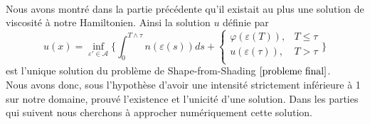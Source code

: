 ~\\

Nous avons montré dans la partie précédente qu'il existait au plus une solution de viscosité à notre Hamiltonien. Ainsi la solution $u$ définie par 
\begin{equation*}
    u(x)= \inf_{\varepsilon'\in \mathcal{A}}\biggl\{\int_{0}^{T\wedge \tau}n(\varepsilon(s))ds +
    \begin{cases}
        \varphi\left(\varepsilon\left(T\right)\right), &T\le \tau\\
        u\left(\varepsilon\left(\tau\right)\right), &T> \tau\\ 
    \end{cases}\biggl\}
\end{equation*}
est l'unique solution du problème de Shape-from-Shading $\eqref{probleme final}$.\\

Nous avons donc, sous l'hypothèse d'avoir une intensité strictement inférieure à 1 sur notre domaine, prouvé l'existence et l'unicité d'une solution. Dans les parties qui suivent nous cherchons à approcher numériquement cette solution.
